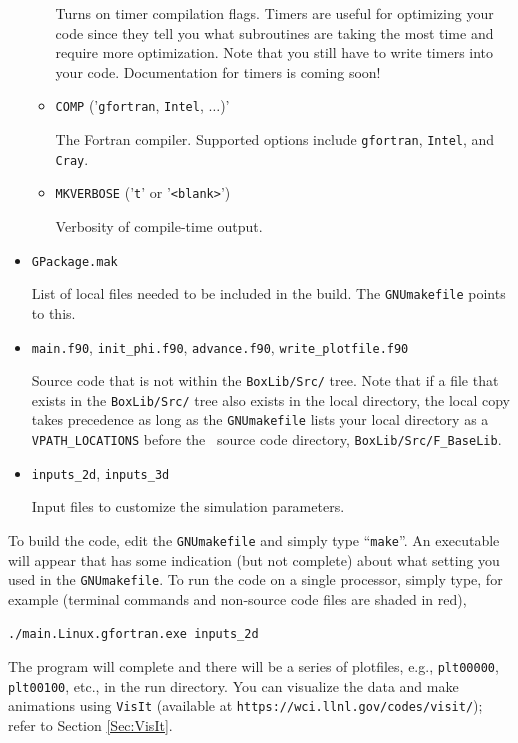 \begin{itemize}
\begin{itemize}
    Turns on timer compilation flags.  Timers are useful for optimizing your code since they tell you 
    what subroutines are taking the most time and require more optimization.  Note that you still have 
    to write timers into your code.  Documentation for timers is coming soon!

    \item {\tt COMP} ('{\tt gfortran}, {\tt Intel}, $\ldots$)'

    The Fortran compiler.  Supported options include {\tt gfortran}, {\tt Intel}, 
    and {\tt Cray}.

    \item {\tt MKVERBOSE} ('{\tt t}' or '{\tt <blank>}')

    Verbosity of compile-time output.

  \end{itemize}

\item {\tt GPackage.mak}

List of local files needed to be included in the build.  The {\tt GNUmakefile} points to this.

\item {\tt main.f90}, {\tt init\_phi.f90}, {\tt advance.f90}, {\tt write\_plotfile.f90}

Source code that is not within the {\tt BoxLib/Src/} tree.  Note that 
if a file that exists in the
{\tt BoxLib/Src/} tree also exists in the local directory, the local copy takes precedence
as long as the {\tt GNUmakefile} lists your local directory as a {\tt VPATH\_LOCATIONS} 
before the \BoxLib\ source code directory, {\tt BoxLib/Src/F\_BaseLib}.

\item {\tt inputs\_2d}, {\tt inputs\_3d}

Input files to customize the simulation parameters.

\end{itemize}

To build the code, edit the {\tt GNUmakefile} and simply type ``{\tt make}''.  An 
executable will appear that has some indication (but not complete)
about what setting you used in the {\tt GNUmakefile}.  To run the code on a single processor,
simply type, for example (terminal commands and non-source code files are shaded in red),
\begin{lstlisting}[backgroundcolor=\color{light-red}]
./main.Linux.gfortran.exe inputs_2d
\end{lstlisting}
The program will complete and there will be a series of plotfiles, e.g., {\tt plt00000}, 
{\tt plt00100}, etc., in the run directory.  You can visualize the data 
and make animations using {\tt VisIt} (available at {\tt https://wci.llnl.gov/codes/visit/});
refer to Section \ref{Sec:VisIt}.

